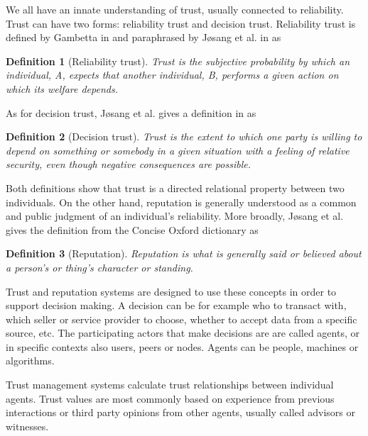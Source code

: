 \documentclass[%
    ]{\PathToTumTemplate/thesis/tum_thesis}
\newtheorem{definition}{Definition}[chapter]
\begin{document}

We all have an innate understanding of trust, usually connected to reliability.
Trust can have two forms: reliability trust and decision trust\cite{josang_trust_2007,josang_survey_2017}.
Reliability trust is defined by Gambetta in \cite{gambetta_can_2000} and paraphrased by Jøsang et al. in \cite{josang_survey_2017} as
\begin{definition}[Reliability trust]
Trust is the subjective probability by which an individual, A, expects that another individual, B, performs a given action on which its welfare depends.
\end{definition}

As for decision trust, Jøsang et al. gives a definition in \cite{josang_survey_2017} as
\begin{definition}[Decision trust]
Trust is the extent to which one party is willing to depend on something or somebody in a given situation with a feeling of relative security, even though negative consequences are possible.
\end{definition}

Both definitions show that trust is a directed relational property between two individuals.
On the other hand, reputation is generally understood as a common and public judgment of an individual's reliability.
More broadly, Jøsang et al. gives the definition from the Concise Oxford dictionary as
\begin{definition}[Reputation]
Reputation is what is generally said or believed about a person’s or thing’s character or standing.
\end{definition}

Trust and reputation systems are designed to use these concepts in order to support decision making.
A decision can be for example who to transact with, which seller or service provider to choose, whether to accept data from a specific source, etc.
The participating actors that make decisions are are called agents, or in specific contexts also users, peers or nodes.
Agents can be people, machines or algorithms.

Trust management systems calculate trust relationships between individual agents.
Trust values are most commonly based on experience from previous interactions or third party opinions from other agents, usually called advisors or witnesses.
\end{document}

